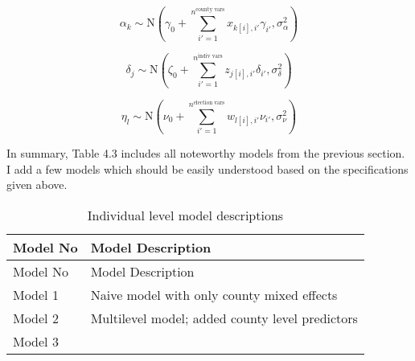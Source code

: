 \documentclass[12pt,twoside]{reedthesis}
\begin{document}
  \[\alpha_{k} \sim \text{N}(\gamma_0 + \sum_{i'=1}^{n^{\text{county vars}}}x_{k[i], i'}\gamma_{i'}, \sigma_{\alpha}^2)\]
  
  \[\delta_{j} \sim \text{N}(\zeta_0 + \sum_{i'=1}^{n^{\text{indiv vars}}}z_{j[i], i'}\delta_{i'}, \sigma_{\delta}^2)\]
  
  \[\eta_{l} \sim \text{N}(\nu_0 + \sum_{i'=1}^{n^{\text{election vars}}}w_{l[i], i'}\nu_{i'}, \sigma_{\nu}^2)\]
  
  In summary, Table 4.3 includes all noteworthy models from the previous
  section. I add a few models which should be easily understood based on
  the specifications given above.
  
  \begin{longtable}[]{@{}ll@{}}
  \caption{Individual level model descriptions
  \label{tab:model_desc_individual}}\tabularnewline
  \toprule
  \begin{minipage}[b]{0.15\columnwidth}\raggedright\strut
  Model No\strut
  \end{minipage} & \begin{minipage}[b]{0.80\columnwidth}\raggedright\strut
  Model Description\strut
  \end{minipage}\tabularnewline
  \midrule
  \endfirsthead
  \toprule
  \begin{minipage}[b]{0.15\columnwidth}\raggedright\strut
  Model No\strut
  \end{minipage} & \begin{minipage}[b]{0.80\columnwidth}\raggedright\strut
  Model Description\strut
  \end{minipage}\tabularnewline
  \midrule
  \endhead
  \begin{minipage}[t]{0.15\columnwidth}\raggedright\strut
  Model 1\strut
  \end{minipage} & \begin{minipage}[t]{0.80\columnwidth}\raggedright\strut
  Naive model with only county mixed effects\strut
  \end{minipage}\tabularnewline
  \begin{minipage}[t]{0.15\columnwidth}\raggedright\strut
  Model 2\strut
  \end{minipage} & \begin{minipage}[t]{0.80\columnwidth}\raggedright\strut
  Multilevel model; added county level predictors\strut
  \end{minipage}\tabularnewline
  \begin{minipage}[t]{0.15\columnwidth}\raggedright\strut
  Model 3\strut
  \end{minipage} & \begin{minipage}[t]{0.80\columnwidth}\raggedright\strut

\end{minipage}
\end{longtable}
\end{document}
